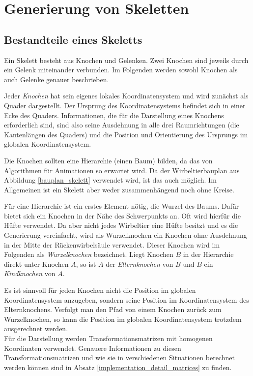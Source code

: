 \chapter{Generierung von Skeletten}
\label{chapter:skeleton_generation}



\section{Bestandteile eines Skeletts}

Ein Skelett besteht aus Knochen und Gelenken. Zwei Knochen sind jeweils durch ein Gelenk miteinander verbunden. Im Folgenden werden sowohl Knochen als auch Gelenke genauer beschrieben.

Jeder \emph{Knochen} hat sein eigenes lokales Koordinatensystem und wird zunächst als Quader dargestellt. Der Ursprung des Koordinatensystems befindet sich in einer Ecke des Quaders.
Informationen, die für die Darstellung eines Knochens erforderlich sind, sind also
seine Ausdehnung in alle drei Raumrichtungen (die Kantenlängen des Quaders) und die Position und Orientierung des Ursprungs im globalen Koordinatensystem.

Die Knochen sollten eine Hierarchie (einen Baum) bilden, da das von Algorithmen für Animationen so erwartet wird.  Da der Wirbeltierbauplan aus Abbildung \ref{bauplan_skelett} verwendet wird, ist das auch möglich. Im Allgemeinen ist ein Skelett aber weder zusammenhängend noch ohne Kreise.

Für eine Hierarchie ist ein erstes Element nötig, die Wurzel des Baums.
Dafür bietet sich ein Knochen in der Nähe des Schwerpunkts an. Oft wird hierfür die Hüfte verwendet. 
Da aber nicht jedes Wirbeltier eine Hüfte besitzt und es die Generierung vereinfacht, wird als Wurzelknochen ein Knochen ohne Ausdehnung in der Mitte der Rückenwirbelsäule verwendet. Dieser Knochen wird im Folgenden als \emph{Wurzelknochen} bezeichnet. Liegt Knochen $B$ in der Hierarchie direkt unter Knochen $A$, so ist $A$ der \emph{Elternknochen} von $B$ und $B$ ein \emph{Kindknochen} von $A$.

Es ist sinnvoll für jeden Knochen nicht die Position im globalen Koordinatensystem anzugeben, sondern seine Position im Koordinatensystem des Elternknochens. Verfolgt man den Pfad von einem Knochen zurück zum Wurzelknochen, so kann die Position im globalen Koordinatensystem trotzdem ausgerechnet werden.  \\
Für die Darstellung werden Transformationsmatrizen mit homogenen Koordinaten verwendet. Genauere Informationen zu diesen Transformationsmatrizen und wie sie in verschiedenen Situationen berechnet werden können sind in Absatz \ref{implementation_detail_matrices} zu finden.

